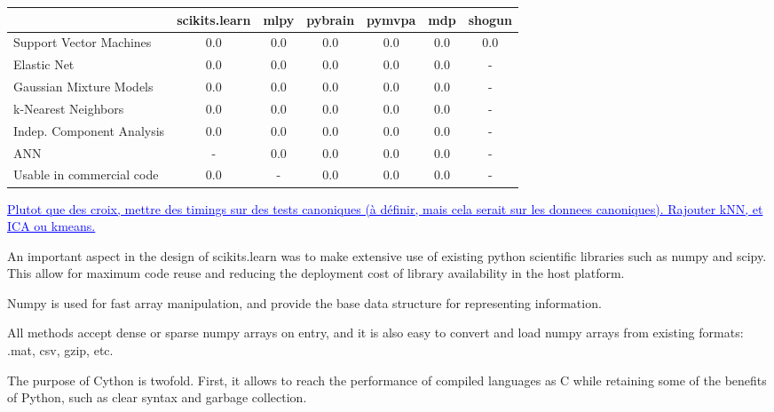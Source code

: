 \documentclass[twoside,11pt]{article}
\newcommand{\GAEL}[1]{\textcolor{blue}{\uline{#1}}}
\begin{document}
\begin{center}


\begin{tabular}{l c c c c c c}
\hline\hline %
 & scikits.learn & mlpy & pybrain & pymvpa &  mdp & shogun \\ [0.5ex]
\hline
Support Vector Machines        & 0.0 & 0.0   & 0.0       &  0.0     & 0.0    & 0.0 \\
Elastic Net & 0.0 & 0.0   & 0.0       &  0.0     & 0.0    & - \\
Gaussian Mixture Models  & 0.0 & 0.0   & 0.0       &  0.0     & 0.0    & - \\
k-Nearest Neighbors & 0.0 & 0.0   & 0.0       &  0.0     & 0.0    & - \\
Indep. Component Analysis & 0.0 & 0.0  & 0.0  & 0.0  & 0.0  & - \\
ANN  & - & 0.0  & 0.0  & 0.0  & 0.0  & - \\
Usable in commercial code &  0.0 & -   & 0.0       &  0.0     & 0.0    & - \\
\hline
\end{tabular}
\GAEL{Plutot que des croix, mettre des timings sur des tests canoniques (à 
définir, mais cela serait sur les donnees canoniques). Rajouter kNN, et
ICA ou kmeans.}\\

\end{center}

An important aspect in the design of scikits.learn was to make
extensive use of existing python scientific libraries such as numpy
and scipy. This allow for maximum code reuse and reducing the
deployment cost of library availability in the host platform.


Numpy is used for fast array manipulation, and provide the base data
structure for representing information. 

All methods accept dense or
sparse numpy arrays on entry, and it is also easy to convert and load
numpy arrays from existing formats: .mat, csv, gzip, etc.


The purpose of Cython is twofold. First, it allows to reach the
performance of compiled languages as C while retaining some of the
benefits of Python, such as clear syntax and garbage collection.
\end{document}
